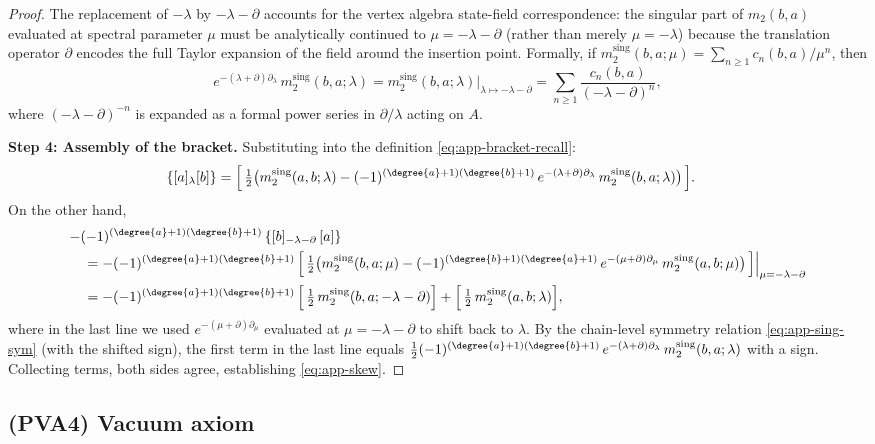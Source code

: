 \begin{proof}
The replacement of $-\lambda$ by $-\lambda - \partial$ accounts for the vertex algebra state-field correspondence: the singular part of $m_2(b,a)$ evaluated at spectral parameter $\mu$ must be analytically continued to $\mu = -\lambda - \partial$ (rather than merely $\mu = -\lambda$) because the translation operator $\partial$ encodes the full Taylor expansion of the field around the insertion point. Formally, if $m_2^{\mathrm{sing}}(b,a;\mu) = \sum_{n\ge 1} c_n(b,a)/\mu^n$, then
\[
e^{-(\lambda + \partial)\partial_\lambda}\,m_2^{\mathrm{sing}}(b,a;\lambda) = m_2^{\mathrm{sing}}(b,a;\lambda)\big|_{\lambda \mapsto -\lambda - \partial} = \sum_{n\ge 1}\frac{c_n(b,a)}{(-\lambda - \partial)^n},
\]
where $(-\lambda - \partial)^{-n}$ is expanded as a formal power series in $\partial/\lambda$ acting on $A$.

\textbf{Step 4: Assembly of the bracket.}
Substituting into the definition \eqref{eq:app-bracket-recall}:
\begin{align*}
\{[a]{}_\lambda [b]\} &= \Bigl[\,\tfrac{1}{2}\bigl(m_2^{\mathrm{sing}}(a,b;\lambda) - (-1)^{(\degree{a}+1)(\degree{b}+1)}\,e^{-(\lambda+\partial)\partial_\lambda}\,m_2^{\mathrm{sing}}(b,a;\lambda)\bigr)\,\Bigr].
\end{align*}
On the other hand,
\begin{align*}
&{-}(-1)^{(\degree{a}+1)(\degree{b}+1)}\,\{[b]{}_{-\lambda-\partial}\,[a]\}\\
&\quad = -(-1)^{(\degree{a}+1)(\degree{b}+1)}\,\Bigl[\,\tfrac{1}{2}\bigl(m_2^{\mathrm{sing}}(b,a;\mu) - (-1)^{(\degree{b}+1)(\degree{a}+1)}\,e^{-(\mu+\partial)\partial_\mu}\,m_2^{\mathrm{sing}}(a,b;\mu)\bigr)\,\Bigr]\Big|_{\mu = -\lambda - \partial}\\
&\quad = -(-1)^{(\degree{a}+1)(\degree{b}+1)}\,\Bigl[\,\tfrac{1}{2}\,m_2^{\mathrm{sing}}(b,a;-\lambda-\partial)\Bigr] + \Bigl[\,\tfrac{1}{2}\,m_2^{\mathrm{sing}}(a,b;\lambda)\Bigr],
\end{align*}
where in the last line we used $e^{-(\mu+\partial)\partial_\mu}$ evaluated at $\mu = -\lambda - \partial$ to shift back to $\lambda$. By the chain-level symmetry relation \eqref{eq:app-sing-sym} (with the shifted sign), the first term in the last line equals $\tfrac{1}{2}(-1)^{(\degree{a}+1)(\degree{b}+1)}\,e^{-(\lambda+\partial)\partial_\lambda}\,m_2^{\mathrm{sing}}(b,a;\lambda)$ with a sign. Collecting terms, both sides agree, establishing \eqref{eq:app-skew}.
\end{proof}

\subsection{(PVA4) Vacuum axiom}

